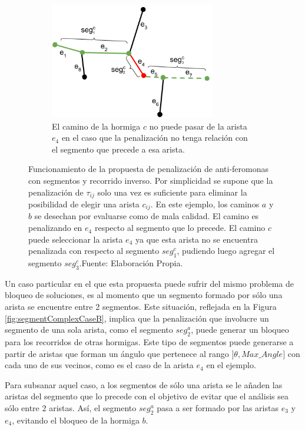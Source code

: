 \begin{figure}[t!]
    \begin{subfigure}[t]{\textwidth}
        \centering
        \includegraphics[height=2in]{imagenes/ant_segments_complex_case_block.png}
	    \caption{El camino de la hormiga $c$ no puede pasar de la arista $e_4$ en el caso que la penalizaci\'on no tenga relaci\'on con el segmento que precede a esa arista.}
        \label{fig:segmentComplexCaseBlocked}
    \end{subfigure}
    \caption{Funcionamiento de la propuesta de penalizaci\'on de anti-feromonas con segmentos y recorrido inverso. Por simplicidad se supone que la penalizaci\'on de $\tau_{ij}$ solo una vez es suficiente para eliminar la posibilidad de elegir una arista $c_{ij}$. En este ejemplo, los caminos $a$ y $b$ se desechan por evaluarse como de mala calidad. El camino es penalizando en $e_4$ respecto al segmento que lo precede. El camino $c$ puede seleccionar la arista $e_4$ ya que esta arista no se encuentra penalizada con respecto al segmento $seg^{c}_1$, pudiendo luego agregar el segmento $seg^{c}_3$.Fuente: Elaboraci\'on Propia.}
    \label{fig:segmentComplexCase}
\end{figure}

Un caso particular en el que esta propuesta puede sufrir del mismo problema de bloqueo de soluciones, es al momento que un segmento formado por s\'olo una arista se encuentre entre 2 segmentos. Este situaci\'on, reflejada en la Figura \ref{fig:segmentComplexCaseB}, implica que la penalizaci\'on que involucre un segmento de una sola arista, como el segmento $seg^{a}_2$, puede generar un bloqueo para los recorridos de otras hormigas. Este tipo de segmentos puede generarse a partir de aristas que forman un \'angulo que pertenece al rango $]\theta, Max\_Angle]$ con cada uno de sus vecinos, como es el caso de la arista $e_4$ en el ejemplo.

Para subsanar aquel caso, a los segmentos de s\'olo una arista se le a\~naden las aristas del segmento que lo precede con el objetivo de evitar que el an\'alisis sea s\'olo entre 2 aristas. As\'i, el segmento $seg^{a}_2$ pasa a ser formado por las aristas $e_3$ y $e_4$, evitando el bloqueo de la hormiga $b$.

